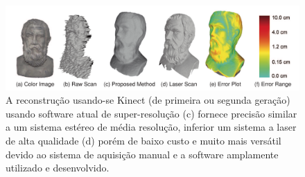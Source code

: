 
\begin{figure}[!h]
	\centering
	\includegraphics[width=1\linewidth]{figs/kinect-vs-usual.png}
	\caption{%
    A reconstrução usando-se Kinect (de primeira ou segunda geração) usando
    software atual de super-resolução (c) fornece precisão similar a um sistema estéreo de média
    resolução, inferior um sistema a laser de alta qualidade (d) porém de baixo custo e
    muito mais versátil devido ao sistema de aquisição manual e a software
    amplamente utilizado e
    desenvolvido\cite{wang2015research}.
	}\label{fig:rec3d:comparacao}
\end{figure}

